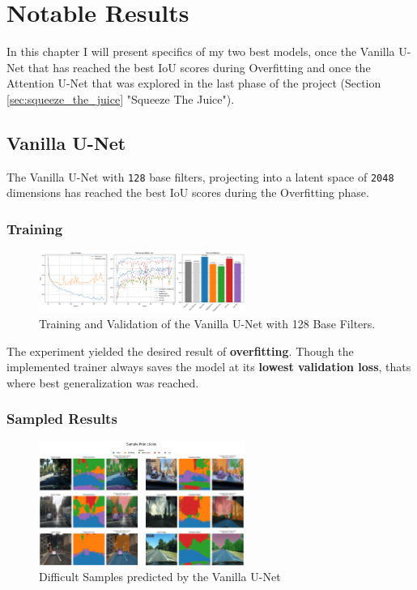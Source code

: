 \chapter{Notable Results}
In this chapter I will present specifics of my two best models, once the Vanilla U-Net that has reached the best IoU scores during Overfitting and once the Attention U-Net that was explored in the last phase of the project (Section \ref{sec:squeeze_the_juice} "Squeeze The Juice").

\section{Vanilla U-Net}
The Vanilla U-Net with \texttt{128} base filters, projecting into a latent space of \texttt{2048} dimensions has reached the best IoU scores during the Overfitting phase.

\subsection{Training}

\begin{figure}[h] 
    \centering 
    \includegraphics[width=0.6\textwidth]{figures/unet_overfit_training.png} 
    \caption{Training and Validation of the Vanilla U-Net with 128 Base Filters.}
    \label{fig:unet_overfit_training} 
\end{figure}

The experiment yielded the desired result of \textbf{overfitting}. Though the implemented trainer always saves the model at its \textbf{lowest validation loss}, thats where best generalization was reached.

\subsection{Sampled Results}

\begin{figure}[h] 
    \centering 
    \includegraphics[width=0.6\textwidth]{figures/overfit_samples.png} 
    \caption{Difficult Samples predicted by the Vanilla U-Net}
    \label{fig:overfit_samples} 
\end{figure}

